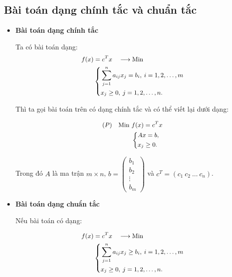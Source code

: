\documentclass[12pt,a4paper]{report}
\begin{document}
\subsection{Bài toán dạng chính tắc và chuẩn tắc}
\begin{itemize}
    \item \textbf{Bài toán dạng chính tắc}
    
    Ta có bài toán dạng:
    \begin{equation} \small \label{F}
        \begin{split}
        f(x) & = c^Tx \quad \longrightarrow \text{Min} \\
            & \left\{
            \begin{split}
            & \sum _{j=1}^n a_{ij} x_j = b_i, \: i=1,2,\ldots,m \\
            & x_j \geq 0, \: j=1,2,\ldots,n.
            \end{split}
            \right.    
        \end{split}
    \end{equation}

    Thì ta gọi bài toán trên có dạng chính tắc và có thể viết lại dưới dạng:

    \begin{equation} \small \label{chinhtac}
        \begin{split}
        (P) \quad \text{Min } & f(x) = c^Tx \\
            & \left\{
            \begin{split}
            & Ax=b, \\
            & x_j \geq 0.
            \end{split}
            \right.    
        \end{split}
    \end{equation}

    Trong đó $A$ là ma trận $m\times n$, $b=\begin{pmatrix}
        b_1 \\
        b_2 \\
        \vdots \\
        b_m
        \end{pmatrix}$ và $c^T=(c_1 \: c_2 \: \ldots \: c_n)$.

    \item \textbf{Bài toán dạng chuẩn tắc}
    
    Nếu bài toán có dạng:

    \begin{equation} \small \label{F}
        \begin{split}
        f(x) & = c^Tx \quad \longrightarrow \text{Min} \\
            & \left\{
            \begin{split}
            & \sum _{j=1}^n a_{ij} x_j \geq b_i, \: i=1,2,\ldots,m \\
            & x_j \geq 0, \: j=1,2,\ldots,n.
            \end{split}
            \right.    
        \end{split}
    \end{equation}


\end{itemize}
\end{document}
